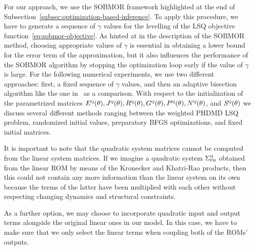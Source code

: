 For our approach, we use the \ac{SOBMOR} framework highlighted at the end of Subsection~\ref{subsec:optimization-based-inference}.
To apply this procedure, we have to generate a sequence of $\gamma$ values for the levelling of the \ac{LSQ} objective function~\eqref{eq:sobmor-objective}.
As hinted at in the description of the \ac{SOBMOR} method, choosing appropriate values of $\gamma$ is essential in obtaining a lower bound for the error term of the approximation, but it also influences the performance of the \ac{SOBMOR} algorithm by stopping the optimization loop early if the value of $\gamma$ is large.
For the following numerical experiments, we use two different approaches: first, a fixed sequence of $\gamma$ values, and then an adaptive bisection algorithm like the one in~\cite{SV2021} as a comparison.
With respect to the initialization of the parametrized matrices $E^{\textnormal{\scshape q}}(\theta), J^{\textnormal{\scshape q}}(\theta), R^{\textnormal{\scshape q}}(\theta), G^{\textnormal{\scshape q}}(\theta), P^{\textnormal{\scshape q}}(\theta), N^{\textnormal{\scshape q}}(\theta)$, and $S^{\textnormal{\scshape q}}(\theta)$ we discuss several different methods ranging between the weighted \ac{PHDMD} \ac{LSQ} problem, randomized initial values, preparatory \ac{BFGS} optimizations, and fixed initial matrices.

It is important to note that the quadratic system matrices cannot be computed from the linear system matrices.
If we imagine a quadratic system $\Sigma_{\textnormal{\scshape ph}}^{\textnormal{\scshape q}}$ obtained from the linear \ac{ROM} by means of the Kronecker and Khatri-Rao products, then this could not contain any more information than the linear system on its own because the terms of the latter have been multiplied with each other without respecting changing dynamics and structural constraints.

As a further option, we may choose to incorporate quadratic input and output terms alongside the original linear ones in our model.
In this case, we have to make sure that we only select the linear terms when coupling both of the \acp{ROM}' outputs.
